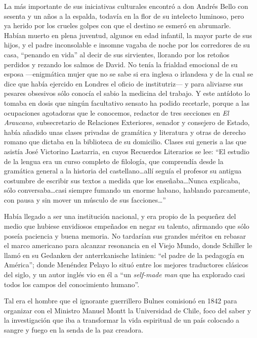 \documentclass[10pt,twoside,openright]{memoir}
\begin{document}
La más importante de sus iniciativas culturales encontró a don Andrés
Bello con sesenta y un años a la espalda, todavía en la flor de su
intelecto luminoso, pero ya herido por los crueles golpes con que el
destino se esmeró en abrumarle. Habían muerto en plena juventud, algunos
en edad infantil, la mayor parte de sus hijos, y el padre inconsolable e
insomne vagaba de noche por los corredores de su casa, ``penando en vida''
al decir de sus sirvientes, llorando por los retoños perdidos y rezando
los salmos de David. No tenía la frialdad emocional de su esposa
---enigmática mujer que no se sabe si era inglesa o irlandesa y de la
cual se dice que había ejercido en Londres el oficio de institutriz--- y
para aliviarse sus pesares obsesivos sólo conocía el sabio la medicina
del trabajo. Y este antídoto lo tomaba en dosis que ningún facultativo
sensato ha podido recetarle, porque a las ocupaciones agotadoras que le
conocemos, redactor de tres secciones en \emph{El Araucano}, subsecretario de
Relaciones Exteriores, senador y consejero de Estado, había añadido unas
clases privadas de gramática y literatura y otras de derecho romano que
dictaba en la biblioteca de su domicilio. Clases sui generis a las que
asistía José Victorino Lastarria, en cuyos Recuerdos Literarios se lee:
``El estudio de la lengua era un curso completo de filología, que
comprendía desde la gramática general a la historia del
castellano\ldots allí seguía el profesor su antigua costumbre de escribir
sus textos a medida que los enseñaba\ldots Nunca explicaba, sólo
conversaba\ldots casi siempre fumando un enorme habano, hablando
parcamente, con pausa y sin mover un músculo de sus facciones\ldots''

Había llegado a ser una institución nacional, y era propio de la
pequeñez del medio que hubiese envidiosos empeñados en negar su talento,
afirmando que sólo poseía paciencia y buena memoria. No tardarían sus
grandes méritos en rebasar el marco americano para alcanzar resonancia
en el Viejo Mundo, donde Schiller le llamó en su Gedanken der
anterrkanische latinien: ``el padre de la pedagogía en América''; donde
Menéndez Pelayo lo situó entre los mejores traductores clásicos del
siglo, y un autor inglés vio en él a ``un \emph{self-made man} que ha explorado
casi todos los campos del conocimiento humano''.

Tal era el hombre que el ignorante guerrillero Bulnes comisionó en 1842
para organizar con el Ministro Manuel Montt la Universidad de Chile,
foco del saber y la investigación que iba a transformar la vida
espiritual de un país colocado a sangre y fuego en la senda de la paz
creadora.
\end{document}

